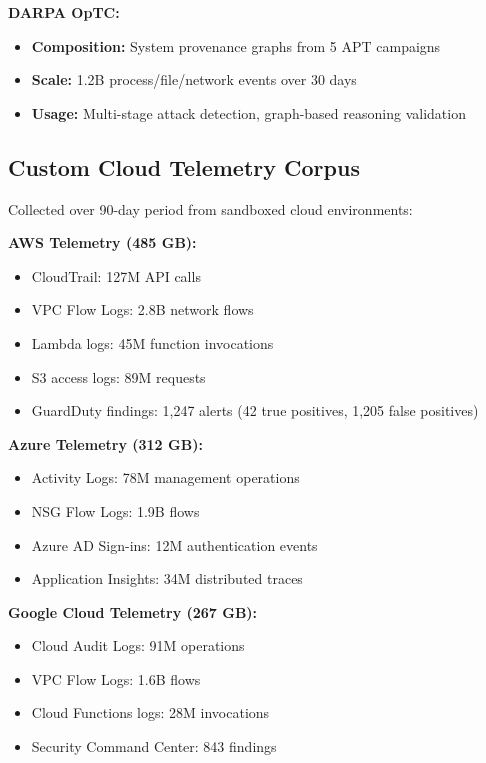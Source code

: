 \textbf{DARPA OpTC:}
\begin{itemize}
    \item \textbf{Composition:} System provenance graphs from 5 APT campaigns
    \item \textbf{Scale:} 1.2B process/file/network events over 30 days
    \item \textbf{Usage:} Multi-stage attack detection, graph-based reasoning validation
\end{itemize}

\subsection{Custom Cloud Telemetry Corpus}
Collected over 90-day period from sandboxed cloud environments:

\textbf{AWS Telemetry (485 GB):}
\begin{itemize}
    \item CloudTrail: 127M API calls
    \item VPC Flow Logs: 2.8B network flows
    \item Lambda logs: 45M function invocations
    \item S3 access logs: 89M requests
    \item GuardDuty findings: 1,247 alerts (42 true positives, 1,205 false positives)
\end{itemize}

\textbf{Azure Telemetry (312 GB):}
\begin{itemize}
    \item Activity Logs: 78M management operations
    \item NSG Flow Logs: 1.9B flows
    \item Azure AD Sign-ins: 12M authentication events
    \item Application Insights: 34M distributed traces
\end{itemize}

\textbf{Google Cloud Telemetry (267 GB):}
\begin{itemize}
    \item Cloud Audit Logs: 91M operations
    \item VPC Flow Logs: 1.6B flows
    \item Cloud Functions logs: 28M invocations
    \item Security Command Center: 843 findings
\end{itemize}

